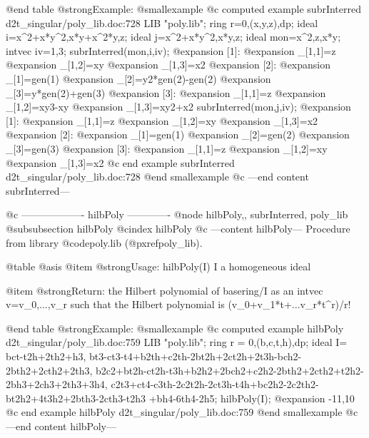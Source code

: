 @end table
@strong{Example:}
@smallexample
@c computed example subrInterred d2t_singular/poly_lib.doc:728 
LIB "poly.lib";
ring r=0,(x,y,z),dp;
ideal i=x^2+x*y^2,x*y+x^2*y,z;
ideal j=x^2+x*y^2,x*y,z;
ideal mon=x^2,z,x*y;
intvec iv=1,3;
subrInterred(mon,i,iv);
@expansion{} [1]:
@expansion{}    _[1,1]=z
@expansion{}    _[1,2]=xy
@expansion{}    _[1,3]=x2
@expansion{} [2]:
@expansion{}    _[1]=gen(1)
@expansion{}    _[2]=y2*gen(2)-gen(2)
@expansion{}    _[3]=y*gen(2)+gen(3)
@expansion{} [3]:
@expansion{}    _[1,1]=z
@expansion{}    _[1,2]=xy3-xy
@expansion{}    _[1,3]=xy2+x2
subrInterred(mon,j,iv);
@expansion{} [1]:
@expansion{}    _[1,1]=z
@expansion{}    _[1,2]=xy
@expansion{}    _[1,3]=x2
@expansion{} [2]:
@expansion{}    _[1]=gen(1)
@expansion{}    _[2]=gen(2)
@expansion{}    _[3]=gen(3)
@expansion{} [3]:
@expansion{}    _[1,1]=z
@expansion{}    _[1,2]=xy
@expansion{}    _[1,3]=x2
@c end example subrInterred d2t_singular/poly_lib.doc:728
@end smallexample
@c ---end content subrInterred---

@c ------------------- hilbPoly -------------
@node hilbPoly,, subrInterred, poly_lib
@subsubsection hilbPoly
@cindex hilbPoly
@c ---content hilbPoly---
Procedure from library @code{poly.lib} (@pxref{poly_lib}).

@table @asis
@item @strong{Usage:}
hilbPoly(I) I a homogeneous ideal

@item @strong{Return:}
the Hilbert polynomial of basering/I as an intvec v=v_0,...,v_r
such that the Hilbert polynomial is (v_0+v_1*t+...v_r*t^r)/r!

@end table
@strong{Example:}
@smallexample
@c computed example hilbPoly d2t_singular/poly_lib.doc:759 
LIB "poly.lib";
ring r = 0,(b,c,t,h),dp;
ideal I=
bct-t2h+2th2+h3,
bt3-ct3-t4+b2th+c2th-2bt2h+2ct2h+2t3h-bch2-2bth2+2cth2+2th3,
b2c2+bt2h-ct2h-t3h+b2h2+2bch2+c2h2-2bth2+2cth2+t2h2-2bh3+2ch3+2th3+3h4,
c2t3+ct4-c3th-2c2t2h-2ct3h-t4h+bc2h2-2c2th2-bt2h2+4t3h2+2bth3-2cth3-t2h3
+bh4-6th4-2h5;
hilbPoly(I);
@expansion{} -11,10
@c end example hilbPoly d2t_singular/poly_lib.doc:759
@end smallexample
@c ---end content hilbPoly---
